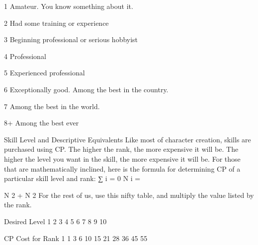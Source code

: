 \documentclass[twoside]{book}
\begin{document}
                
                 1   
                 Amateur. You know something about it.   
                
                
                 2   
                 Had some training or experience   
                
                
                 3   
                   Beginning professional or serious hobbyist
                   
                
                
                 4   
                 Professional   
                
                
                 5   
                 Experienced professional   
                
                
                 6   
                   Exceptionally good. Among the best in the
                   country. 
                
                
                 7   
                 Among the best in the world.   
                
                
                 8+   
                 Among the best ever   
                
              
              Skill Level and Descriptive Equivalents
           Like most of character creation, skills are purchased
             using CP. The higher the rank, the more expensive it will
             be. The higher the level you want in the skill, the more
             expensive it will be.  For those that are mathematically inclined, here is
             the formula for determining CP of a particular skill level
             and rank:     
                   ∑    i
                    =  0    N  
                      i    =   
                    
                     N  2 
                       +    N     
                   2        For the rest of us, use this nifty table, and multiply
             the value listed by the rank.   
              
                
                 Desired Level   
                 1   
                 2   
                 3   
                 4   
                 5   
                 6   
                 7   
                 8   
                 9   
                 10   
                
                
                 CP Cost for Rank 1   
                 1   
                 3   
                 6   
                 10   
                 15   
                 21   
                 28   
                 36   
                 45   
                 55   
                
\end{document}
